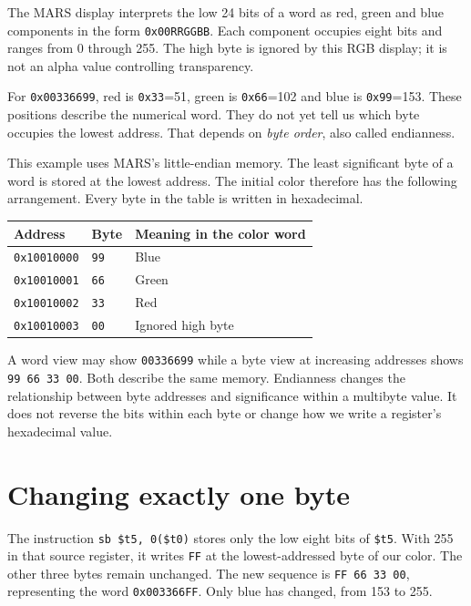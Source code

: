 The MARS display interprets the low 24 bits of a word as red, green and blue
components in the form \texttt{0x00RRGGBB}. Each component occupies eight bits and
ranges from 0 through 255. The high byte is ignored by this RGB display; it is not
an alpha value controlling transparency.

For \texttt{0x00336699}, red is \texttt{0x33}=51, green is
\texttt{0x66}=102 and blue is \texttt{0x99}=153. These positions describe the
numerical word. They do not yet tell us which byte occupies the lowest address.
That depends on \emph{byte order}, also called endianness.

This example uses MARS's little-endian memory. The least significant byte of a
word is stored at the lowest address. The initial color therefore has the
following arrangement. Every byte in the table is written in hexadecimal.

\begin{center}
  \begin{tabular}{lll}
    \toprule
    Address             & Byte        & Meaning in the color word \\
    \midrule
    \texttt{0x10010000} & \texttt{99} & Blue                      \\
    \texttt{0x10010001} & \texttt{66} & Green                     \\
    \texttt{0x10010002} & \texttt{33} & Red                       \\
    \texttt{0x10010003} & \texttt{00} & Ignored high byte         \\
    \bottomrule
  \end{tabular}
\end{center}

A word view may show \texttt{00336699} while a byte view at increasing addresses
shows \texttt{99 66 33 00}. Both describe the same memory. Endianness changes the
relationship between byte addresses and significance within a multibyte value.
It does not reverse the bits within each byte or change how we write a register's
hexadecimal value.

\section{Changing exactly one byte}

The instruction \texttt{sb \$t5, 0(\$t0)} stores only the low eight bits of
\texttt{\$t5}. With 255 in that source register, it writes \texttt{FF} at the
lowest-addressed byte of our color. The other three bytes remain unchanged.
The new sequence is \texttt{FF 66 33 00}, representing the word
\texttt{0x003366FF}. Only blue has changed, from 153 to 255.


